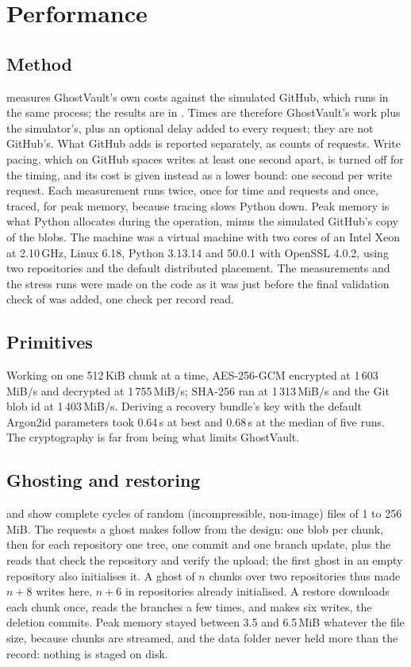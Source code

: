 \section{Performance}\label{sec:performance}

\subsection{Method}
 measures GhostVault's own costs against the simulated GitHub, which runs in
the same process; the results are in . Times are therefore
GhostVault's work plus the simulator's, plus an optional delay added to every request; they are not
GitHub's. What GitHub adds is reported separately, as counts of requests. Write pacing, which on
GitHub spaces writes at least one second apart, is turned off for the timing, and its cost is given
instead as a lower bound: one second per write request. Each measurement runs twice, once for time and
requests and once, traced, for peak memory, because tracing slows Python down. Peak memory is what
Python allocates during the operation, minus the simulated GitHub's copy of the blobs. The machine was a
virtual machine with two cores of an Intel Xeon at 2.10\,GHz, Linux 6.18, Python 3.13.14 and
 50.0.1 with OpenSSL 4.0.2, using two repositories and the default distributed placement. The measurements and the stress runs were made on the code as it was just before the final validation check of  was added, one check per record read.

\subsection{Primitives}
Working on one 512\,KiB chunk at a time, AES-256-GCM encrypted at 1\,603\,MiB/s and decrypted at
1\,755\,MiB/s; SHA-256
ran at 1\,313\,MiB/s and the Git blob id at 1\,403\,MiB/s. Deriving a recovery bundle's key with the
default Argon2id parameters took 0.64\,s at best and 0.68\,s at the median of five runs. The
cryptography is far from being what limits GhostVault.

\subsection{Ghosting and restoring}
 and  show complete cycles of random (incompressible, non-image)
files of 1 to 256\,MiB. The requests a ghost makes follow from the design: one blob per chunk, then for
each repository one tree, one commit and one branch update, plus the reads that check the repository
and verify the upload; the first ghost in an empty repository also initialises it. A ghost of $n$
chunks over two repositories thus made $n+8$ writes here, $n+6$ in repositories already initialised.
A restore downloads each chunk once, reads the branches a few times, and makes six writes, the
deletion commits. Peak memory stayed between
3.5 and 6.5\,MiB whatever the file size, because chunks are streamed, and the data folder never held
more than the record: nothing is staged on disk.

